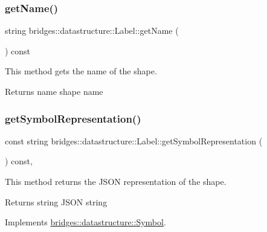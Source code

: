 \subsubsection{\texorpdfstring{get\+Name()}{getName()}}
{\footnotesize\ttfamily string bridges\+::datastructure\+::\+Label\+::get\+Name (\begin{DoxyParamCaption}{ }\end{DoxyParamCaption}) const\hspace{0.3cm}{\ttfamily [inline]}}



This method gets the name of the shape. 

\begin{DoxyReturn}{Returns}
name shape name 
\end{DoxyReturn}
\mbox{\label{classbridges_1_1datastructure_1_1_label_aa3b7c9e5630ecc8a2534e6db2a220e90}} 
\subsubsection{\texorpdfstring{get\+Symbol\+Representation()}{getSymbolRepresentation()}}
{\footnotesize\ttfamily const string bridges\+::datastructure\+::\+Label\+::get\+Symbol\+Representation (\begin{DoxyParamCaption}{ }\end{DoxyParamCaption}) const\hspace{0.3cm}{\ttfamily [inline]}, {\ttfamily [virtual]}}



This method returns the J\+S\+ON representation of the shape. 

\begin{DoxyReturn}{Returns}
string J\+S\+ON string 
\end{DoxyReturn}


Implements \hyperlink{classbridges_1_1datastructure_1_1_symbol_a8044b3da559dcd9de8510ae339f126c8}{bridges\+::datastructure\+::\+Symbol}.

\mbox{\label{classbridges_1_1datastructure_1_1_label_aeaf64e048094d69e11e77563c598a045}} 
